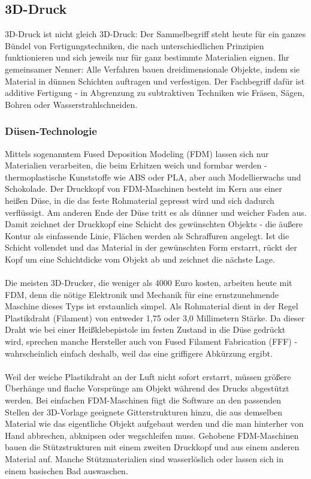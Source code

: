 \subsection{3D-Druck}
3D-Druck ist nicht gleich 3D-Druck: Der Sammelbegriff steht heute für ein ganzes Bündel von Fertigungstechniken, die nach unterschiedlichen Prinzipien funktionieren und sich jeweils nur für ganz bestimmte Materialien eignen. Ihr gemeinsamer Nenner: Alle Verfahren bauen dreidimensionale Objekte, indem sie Material in dünnen Schichten auftragen und verfestigen. Der Fachbegriff dafür ist additive Fertigung - in Abgrenzung zu subtraktiven Techniken wie Fräsen, Sägen, Bohren oder Wasserstrahlschneiden.

\subsubsection{Düsen-Technologie}
Mittels sogenanntem Fused Deposition Modeling (FDM) lassen sich nur Materialien verarbeiten, die beim Erhitzen weich und formbar werden - thermoplastische Kunststoffe wie ABS oder PLA, aber auch Modellierwachs und Schokolade. Der Druckkopf von FDM-Maschinen besteht im Kern aus einer heißen Düse, in die das feste Rohmaterial gepresst wird und sich dadurch verflüssigt. Am anderen Ende der Düse tritt es als dünner und weicher Faden aus. Damit zeichnet der Druckkopf eine Schicht des gewünschten Objekts - die äußere Kontur als einfassende Linie, Flächen werden als Schraffuren angelegt. Ist die Schicht vollendet und das Material in der gewünschten Form erstarrt, rückt der Kopf um eine Schichtdicke vom Objekt ab und zeichnet die nächste Lage.\\
\\
Die meisten 3D-Drucker, die weniger als 4000 Euro kosten, arbeiten heute mit FDM, denn die nötige Elektronik und Mechanik für eine ernstzunehmende Maschine dieses Typs ist erstaunlich simpel. Als Rohmaterial dient in der Regel Plastikdraht (Filament) von entweder 1,75 oder 3,0 Millimetern Stärke. Da dieser Draht wie bei einer Heißklebepistole im festen Zustand in die Düse gedrückt wird, sprechen manche Hersteller auch von Fused Filament Fabrication (FFF) - wahrscheinlich einfach deshalb, weil das eine griffigere Abkürzung ergibt.\\
\\
Weil der weiche Plastikdraht an der Luft nicht sofort erstarrt, müssen größere Überhänge und flache Vorsprünge am Objekt während des Drucks abgestützt werden. Bei einfachen FDM-Maschinen fügt die Software an den passenden Stellen der 3D-Vorlage geeignete Gitterstrukturen hinzu, die aus demselben Material wie das eigentliche Objekt aufgebaut werden und die man hinterher von Hand abbrechen, abknipsen oder wegschleifen muss. Gehobene FDM-Maschinen bauen die Stützstrukturen mit einem zweiten Druckkopf und aus einem anderen Material auf. Manche Stützmaterialien sind wasserlöslich oder lassen sich in einem basischen Bad auswaschen.\\
